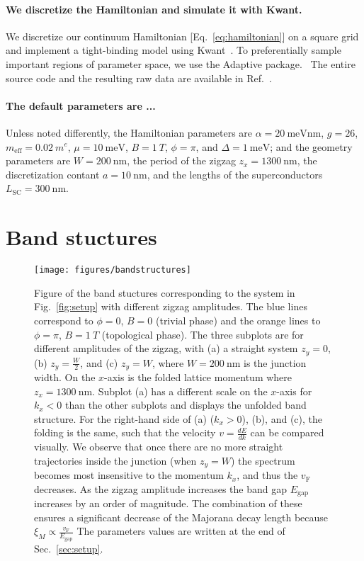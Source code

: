 \documentclass[english, twocolumn, 10pt, aps, superscriptaddress, floatfix, prb, citeautoscript]{revtex4-1}
\newcommand{\meff}{m_\text{eff}}
\renewcommand{\comment}[2]{#2}
\renewcommand{\comment}{\paragraph}
\begin{document}
\comment{We discretize the Hamiltonian and simulate it with Kwant.}
We discretize our continuum Hamiltonian [Eq.~\eqref{eq:hamiltonian}] on a square grid and implement a tight-binding model using Kwant~\cite{groth_kwant:_2014}.
To preferentially sample important regions of parameter space, we use the Adaptive package.~\cite{adaptive}
The entire source code and the resulting raw data are available in Ref.~.  %

\comment{The default parameters are ...}
Unless noted differently, the Hamiltonian parameters are $\alpha=\SI{20}{\meV \nm}$, $g=26$, $\meff=\SI{0.02}{\electronmass}$, $\mu=\SI{10}{\meV}$, $B=\SI{1}{T}$, $\phi=\pi$, and $\Delta=\SI{1}{\meV}$; and the geometry parameters are $W=\SI{200}{\nm}$, the period of the zigzag $z_x=\SI{1300}{\nm}$, the discretization contant $a=\SI{10}{\nm}$, and the lengths of the superconductors $L_\textrm{SC}=\SI{300}{\nm}$.  %


\section{Band stuctures}\label{sec:band_structures}

\begin{figure}[!htb]
\texttt{[image: figures/bandstructures]}
\caption{Figure of the band stuctures corresponding to the system in Fig.~\ref{fig:setup} with different zigzag amplitudes.
The blue lines correspond to $\phi=0$, $B=0$ (trivial phase) and the orange lines to $\phi=\pi$, $B = \SI{1}{T}$ (topological phase).
The three subplots are for different amplitudes of the zigzag, with (a) a straight system $z_y=0$, (b) $z_y=\frac{W}{2}$, and (c) $z_y=W$, where $W=\SI{200}{\nm}$ is the junction width.
On the $x$-axis is the folded lattice momentum where $z_x=\SI{1300}{\nm}$.
Subplot (a) has a different scale on the $x$-axis for $k_x < 0$ than the other subplots and displays the unfolded band structure.
For the right-hand side of (a) ($k_x > 0$), (b), and (c), the folding is the same, such that the velocity $v=\frac{dE}{dk}$ can be compared visually.
We observe that once there are no more straight trajectories inside the junction (when $z_y=W$) the spectrum becomes most insensitive to the momentum $k_x$, and thus the $v_\textrm{F}$ decreases.
As the zigzag amplitude increases the band gap $E_\textrm{gap}$ increases by an order of magnitude.
The combination of these ensures a significant decrease of the Majorana decay length because $\xi_M \propto \frac{v_\textrm{F}}{E_\textrm{gap}}$
The parameters values are written at the end of Sec.~\ref{sec:setup}.\label{fig:band_structures}}
\end{figure}
\end{document}

